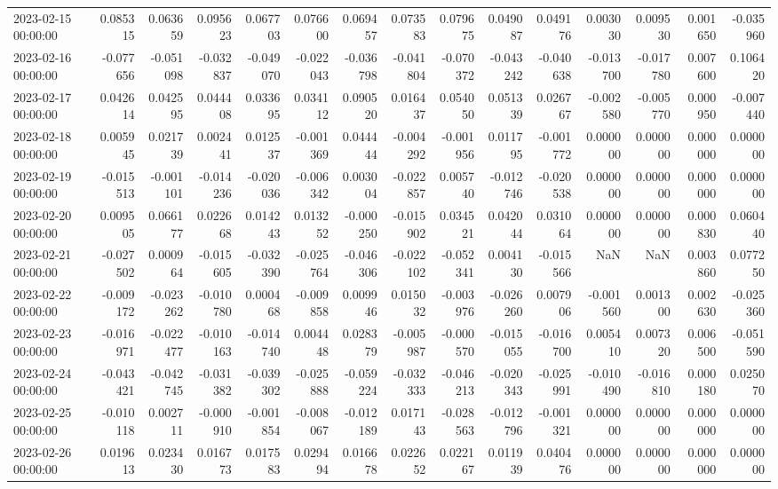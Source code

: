 \begin{tabular}{lrrrrrrrrrrrrrr}
2023-02-15 00:00:00 & 0.085315 & 0.063659 & 0.095623 & 0.067703 & 0.076600 & 0.069457 & 0.073583 & 0.079675 & 0.049087 & 0.049176 & 0.003030 & 0.009530 & 0.001650 & -0.035960 \\
2023-02-16 00:00:00 & -0.077656 & -0.051098 & -0.032837 & -0.049070 & -0.022043 & -0.036798 & -0.041804 & -0.070372 & -0.043242 & -0.040638 & -0.013700 & -0.017780 & 0.007600 & 0.106420 \\
2023-02-17 00:00:00 & 0.042614 & 0.042595 & 0.044408 & 0.033695 & 0.034112 & 0.090520 & 0.016437 & 0.054050 & 0.051339 & 0.026767 & -0.002580 & -0.005770 & 0.000950 & -0.007440 \\
2023-02-18 00:00:00 & 0.005945 & 0.021739 & 0.002441 & 0.012537 & -0.001369 & 0.044444 & -0.004292 & -0.001956 & 0.011795 & -0.001772 & 0.000000 & 0.000000 & 0.000000 & 0.000000 \\
2023-02-19 00:00:00 & -0.015513 & -0.001101 & -0.014236 & -0.020036 & -0.006342 & 0.003004 & -0.022857 & 0.005740 & -0.012746 & -0.020538 & 0.000000 & 0.000000 & 0.000000 & 0.000000 \\
2023-02-20 00:00:00 & 0.009505 & 0.066177 & 0.022668 & 0.014243 & 0.013252 & -0.000250 & -0.015902 & 0.034521 & 0.042044 & 0.031064 & 0.000000 & 0.000000 & 0.000830 & 0.060440 \\
2023-02-21 00:00:00 & -0.027502 & 0.000964 & -0.015605 & -0.032390 & -0.025764 & -0.046306 & -0.022102 & -0.052341 & 0.004130 & -0.015566 & NaN & NaN & 0.003860 & 0.077250 \\
2023-02-22 00:00:00 & -0.009172 & -0.023262 & -0.010780 & 0.000468 & -0.009858 & 0.009946 & 0.015032 & -0.003976 & -0.026260 & 0.007906 & -0.001560 & 0.001300 & 0.002630 & -0.025360 \\
2023-02-23 00:00:00 & -0.016971 & -0.022477 & -0.010163 & -0.014740 & 0.004448 & 0.028379 & -0.005987 & -0.000570 & -0.015055 & -0.016700 & 0.005410 & 0.007320 & 0.006500 & -0.051590 \\
2023-02-24 00:00:00 & -0.043421 & -0.042745 & -0.031382 & -0.039302 & -0.025888 & -0.059224 & -0.032333 & -0.046213 & -0.020343 & -0.025991 & -0.010490 & -0.016810 & 0.000180 & 0.025070 \\
2023-02-25 00:00:00 & -0.010118 & 0.002711 & -0.000910 & -0.001854 & -0.008067 & -0.012189 & 0.017143 & -0.028563 & -0.012796 & -0.001321 & 0.000000 & 0.000000 & 0.000000 & 0.000000 \\
2023-02-26 00:00:00 & 0.019613 & 0.023430 & 0.016773 & 0.017583 & 0.029494 & 0.016678 & 0.022652 & 0.022167 & 0.011939 & 0.040476 & 0.000000 & 0.000000 & 0.000000 & 0.000000 \\

\end{tabular}
